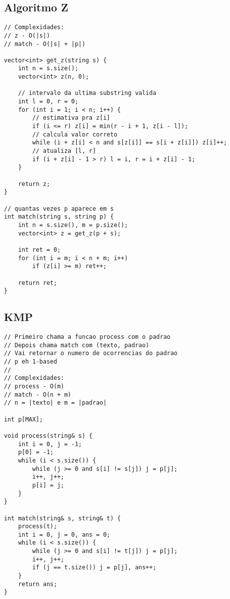 \documentclass[12pt, a4paper, twoside]{article}
\begin{document}
\subsection{Algoritmo Z}
\begin{lstlisting}
// Complexidades:
// z - O(|s|)
// match - O(|s| + |p|)

vector<int> get_z(string s) {
    int n = s.size();
    vector<int> z(n, 0);

    // intervalo da ultima substring valida
    int l = 0, r = 0;
    for (int i = 1; i < n; i++) {
        // estimativa pra z[i]
        if (i <= r) z[i] = min(r - i + 1, z[i - l]);
        // calcula valor correto
        while (i + z[i] < n and s[z[i]] == s[i + z[i]]) z[i]++;
        // atualiza [l, r]
        if (i + z[i] - 1 > r) l = i, r = i + z[i] - 1;
    }

    return z;
}

// quantas vezes p aparece em s
int match(string s, string p) {
    int n = s.size(), m = p.size();
    vector<int> z = get_z(p + s);

    int ret = 0;
    for (int i = m; i < n + m; i++)
        if (z[i] >= m) ret++;
   
    return ret;
}

\end{lstlisting}

\subsection{KMP}
\begin{lstlisting}
// Primeiro chama a funcao process com o padrao
// Depois chama match com (texto, padrao)
// Vai retornar o numero de ocorrencias do padrao
// p eh 1-based
//
// Complexidades:
// process - O(m)
// match - O(n + m)
// n = |texto| e m = |padrao|

int p[MAX];

void process(string& s) {
	int i = 0, j = -1;
	p[0] = -1;
	while (i < s.size()) {
		while (j >= 0 and s[i] != s[j]) j = p[j];
		i++, j++;
		p[i] = j;
	}
}

int match(string& s, string& t) {
	process(t);
	int i = 0, j = 0, ans = 0;
	while (i < s.size()) {
		while (j >= 0 and s[i] != t[j]) j = p[j];
		i++, j++;
		if (j == t.size()) j = p[j], ans++;
	}
	return ans;
}
\end{lstlisting}
\end{document}
